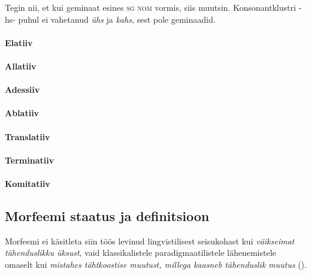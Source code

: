 \documentclass[12pt,a4paper]{article}
\begin{document}
Tegin nii, et kui geminaat esines \textsc{sg nom} vormis, siis muutsin. Konsonant\-klustri -hs- puhul ei vahetanud \textit{ühs} ja \textit{kahs}, sest pole geminaadid.

\paragraph*{Elatiiv}

\paragraph*{Allatiiv}
\paragraph*{Adessiiv}
\paragraph*{Ablatiiv}

\paragraph*{Translatiiv}
\paragraph*{Terminatiiv}

\paragraph*{Komitatiiv}






\subsection{Morfeemi staatus ja definitsioon}
\label{sec:morfeemi-staatus}
Morfeemi ei käsitleta siin töös levinud lingvistilisest seisukohast kui \textit{väikseimat tähenduslikku üksust}, vaid klassikalistele paradigmaatilistele lähenemistele omaselt kui \textit{mistahes tähtkoostise muutust, millega kaasneb tähenduslik muutus} (\cites{beard_morpheme_1987}{beard_lexeme-morpheme_1995}). %

\end{document}
